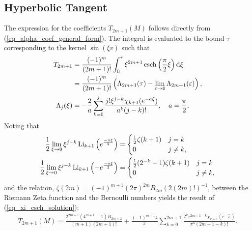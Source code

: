 \subsection{Hyperbolic Tangent}
The expression for the coefficients $T_{2m+1}(M)$
follows directly from
(\ref{eq_alpha_coef_general_form}).  The integral is
evaluated to the bound $\tau$ corresponding to the kernel
$\sin(\xi v)$ such that
\begin{align}
	T_{2m+1} &= \frac{(-1)^m}{(2m+1)!}
	\int_0^{\tau} \xi^{2m+1} \operatorname{csch}\left(\frac{\pi}{2} \xi\right) \mathrm{d}\xi \\
	&=\frac{(-1)^m}{(2m+1)!}\left(
	\Lambda_{2m+1}(\tau) - \lim_{\varepsilon \to 0} \Lambda_{2m+1}(\varepsilon)
	\right), \\
	\Lambda_j(\xi) &= -\frac{2}{a}\sum_{k=0}^{j}
	\frac{j! \xi^{j-k} \chi_{k+1}(e^{-a\xi})}{a^k (j-k)!},\quad a = \frac{\pi}{2}.\nonumber
\end{align}
Noting that
\begin{align}
	\frac{1}{2} \lim_{\xi \to 0} \xi^{j-k}
	\operatorname{Li}_{k+1}\left(e^{\frac{-\pi\xi}{2}}\right)
	&= \begin{cases} 
		\frac{1}{2} \zeta(k+1) & j = k \\
		0 & j \neq k,
	\end{cases}
	\\
	\frac{1}{2} \lim_{\xi \to 0} \xi^{j-k}
	\operatorname{Li}_{k+1}\left(-e^{\frac{-\pi\xi}{2}}\right)
	&= \begin{cases} 
		\frac{1}{2} (2^{-k}-1) \zeta(k+1) & j = k \\
		0 & j \neq k,
	\end{cases}
\end{align}
and the relation,
$\zeta(2m) = (-1)^{m+1}(2\pi)^{2m}B_{2m}(2(2m)!)^{-1}$,
between the Riemann Zeta function and the Bernoulli
numbers yields the result of (\ref{eq_xi_csch_solution}):
\begin{align*}
	T_{2m+1}(M) = \frac{2^{2m+1}(4^{m+1}-1)B_{2m+2}}{(m+1)(2m+1)!}
	+ \frac{(-1)^{m+1}4}{\pi} \sum_{k=0}^{2m+1}
	\frac{2^k \tau^{2m+1-k}
		\chi_{k+1}\left(e^{-\frac{\pi \tau}{2}}\right)}
	{\pi^{k}(2m+1-k)!}.
	\label{eq_xi_csch_solution}
\end{align*}

